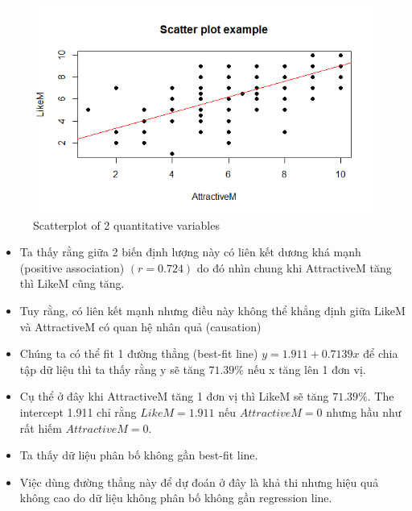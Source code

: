 \documentclass[a4paper,12pt]{article}
\begin{document}
	\begin{figure}[H]
		\centering
		\includegraphics[width=0.8\linewidth]{Images/scatterplot}
		\caption{Scatterplot of 2 quantitative variables}
		\label{fig:scatterplot}
	\end{figure}
	
	\begin{itemize}
		\item Ta thấy rằng giữa 2 biến định lượng này có liên kết dương khá mạnh (positive association) $(r = 0.724)$ do đó nhìn chung khi AttractiveM tăng thì LikeM cũng tăng.
		\item Tuy rằng, có liên kết mạnh nhưng điều này không thể khẳng định giữa LikeM và AttractiveM có quan hệ nhân quả (causation)
		\item Chúng ta có thể fit 1 đường thẳng (best-fit line) $y = 1.911 + 0.7139x$ để chia tập dữ liệu thì ta thấy rằng y sẽ tăng $71.39\%$ nếu x tăng lên 1 đơn vị. 
		\item Cụ thể ở đây khi AttractiveM tăng 1 đơn vị thì LikeM sẽ tăng $71.39\%$. The intercept 1.911 chỉ rằng $LikeM = 1.911$ nếu $AttractiveM = 0$ nhưng hầu như rất hiếm $AttractiveM = 0$.
		\item Ta thấy dữ liệu phân bố không gần best-fit line.
		\item[\textrightarrow] Việc dùng đường thẳng này để dự đoán ở đây là khả thi nhưng hiệu quả không cao do dữ liệu không phân bố không gần regression line.
	\end{itemize}
	
\end{document}
